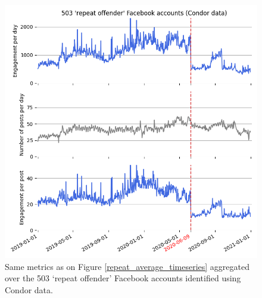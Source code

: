 \documentclass[review]{elsarticle}
\begin{document}
\begin{figure}[!h]
\centering
\includegraphics[scale=0.5]{./../figure/condor_average_timeseries.png}
\caption{
Same metrics as on Figure \ref{repeat_average_timeseries} aggregated over the 503 `repeat offender' Facebook accounts identified using Condor data.
}
\label{condor_average_timeseries}
\end{figure}
\end{document}
